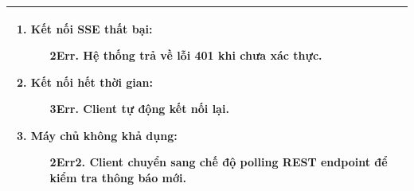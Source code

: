 {\begin{tabularx}{\textwidth}{|>{\raggedright\arraybackslash}p{3.5cm}|>{\raggedright\arraybackslash}X|}
\begin{enumerate}
    \item \textbf{Kết nối SSE thất bại:}
    \begin{enumerate}
        \item[2Err.] Hệ thống trả về lỗi 401 khi chưa xác thực.
    \end{enumerate}
    \item \textbf{Kết nối hết thời gian:}
    \begin{enumerate}
        \item[3Err.] Client tự động kết nối lại.
    \end{enumerate}
    \item \textbf{Máy chủ không khả dụng:}
    \begin{enumerate}
        \item[2Err2.] Client chuyển sang chế độ polling REST endpoint để kiểm tra thông báo mới.
    \end{enumerate}
\end{enumerate} \\
\hline
\end{tabularx}
}
